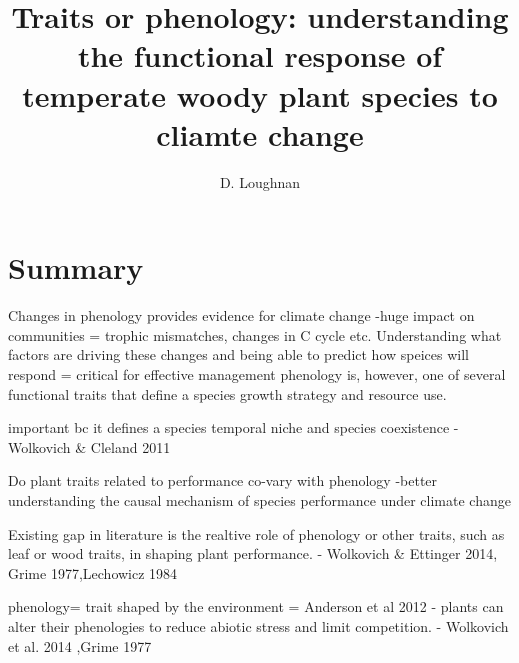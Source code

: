 \documentclass{article}\usepackage[]{graphicx}\usepackage[]{color}
\begin{document}
 
\title{Traits or phenology: understanding the functional response of temperate woody plant species to cliamte change} %

\author{D. Loughnan}
\maketitle  %


\section*{Summary}


Changes in phenology provides evidence for climate change
-huge impact on communities = trophic mismatches, changes in C cycle etc.
Understanding what factors are driving these changes and being able to predict how speices will respond = critical for effective management
phenology is, however, one of several functional traits that define a species growth strategy and resource use.

important bc it defines a species temporal niche and species coexistence - Wolkovich & Cleland 2011

Do plant traits related to performance co-vary with phenology
-better understanding the causal mechanism of species performance under climate change

Existing gap in literature is the realtive role of phenology or other traits, such as leaf or wood traits, in shaping plant performance. - Wolkovich & Ettinger 2014, Grime 1977,Lechowicz 1984

phenology= trait shaped by the environment =  Anderson et al 2012
- plants can alter their phenologies to reduce abiotic stress and limit competition. - Wolkovich et al. 2014 ,Grime 1977
\end{document}
